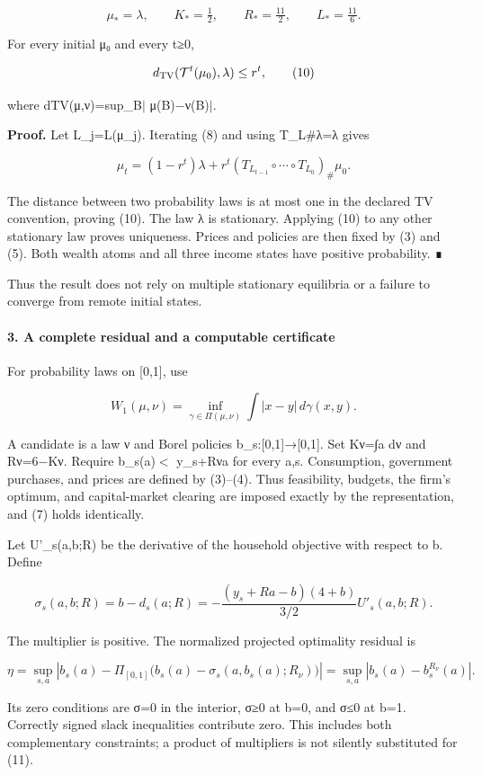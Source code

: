 \documentclass{article}
\begin{document}
\[
\mu_*=\lambda,\qquad K_*=\tfrac12,\qquad R_*=\tfrac{11}{2},
\qquad L_*=\tfrac{11}{6}.
\tag{9}
\]

For every initial μ₀ and every t≥0,

\[
d_{\rm TV}(\mathcal T^t(\mu_0),\lambda)\le r^t,
\tag{10}
\]

where dTV(μ,ν)=sup\_B\(\vert\) μ(B)−ν(B)\(\vert\).

\textbf{Proof.} Let L\_j=L(μ\_j). Iterating (8) and using T\_L\#λ=λ gives

\[
\mu_t=(1-r^t)\lambda+
r^t(T_{L_{t-1}}\circ\cdots\circ T_{L_0})_\#\mu_0.
\]

The distance between two probability laws is at most one in the declared TV convention, proving (10). The law λ is stationary. Applying (10) to any other stationary law proves uniqueness. Prices and policies are then fixed by (3) and (5). Both wealth atoms and all three income states have positive probability. ∎

Thus the result does not rely on multiple stationary equilibria or a failure to converge from remote initial states.

\paragraph{3. A complete residual and a computable certificate}

For probability laws on [0,1], use

\[
W_1(\mu,\nu)=\inf_{\gamma\in\Pi(\mu,\nu)}
\int|x-y|\,d\gamma(x,y).
\]

A candidate is a law ν and Borel policies b\_s:[0,1]→[0,1]. Set Kν=∫a dν and Rν=6−Kν. Require b\_s(a)\(\lt\) y\_s+Rνa for every a,s. Consumption, government purchases, and prices are defined by (3)--(4). Thus feasibility, budgets, the firm's optimum, and capital-market clearing are imposed exactly by the representation, and (7) holds identically.

Let U'\_s(a,b;R) be the derivative of the household objective with respect to b. Define

\[
\sigma_s(a,b;R)=b-d_s(a;R)
=-\frac{(y_s+Ra-b)(4+b)}{3/2}U'_s(a,b;R).
\]

The multiplier is positive. The normalized projected optimality residual is

\[
\eta=\sup_{s,a}
\left|b_s(a)-\Pi_{[0,1]}\bigl(b_s(a)-\sigma_s(a,b_s(a);R_\nu)\bigr)\right|
=\sup_{s,a}|b_s(a)-b_s^{R_\nu}(a)|.
\tag{11}
\]

Its zero conditions are σ=0 in the interior, σ≥0 at b=0, and σ≤0 at b=1. Correctly signed slack inequalities contribute zero. This includes both complementary constraints; a product of multipliers is not silently substituted for (11).
\end{document}
